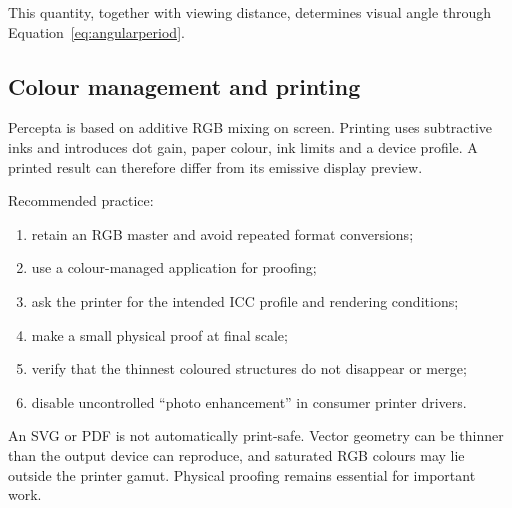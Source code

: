 This quantity, together with viewing distance, determines visual angle through Equation~\eqref{eq:angularperiod}.

\subsection{Colour management and printing}

Percepta is based on additive RGB mixing on screen. Printing uses subtractive inks and introduces dot gain, paper colour, ink limits and a device profile. A printed result can therefore differ from its emissive display preview.

Recommended practice:

\begin{enumerate}
  \item retain an RGB master and avoid repeated format conversions;
  \item use a colour-managed application for proofing;
  \item ask the printer for the intended ICC profile and rendering conditions;
  \item make a small physical proof at final scale;
  \item verify that the thinnest coloured structures do not disappear or merge;
  \item disable uncontrolled ``photo enhancement'' in consumer printer drivers.
\end{enumerate}

\begin{warningbox}
An SVG or PDF is not automatically print-safe. Vector geometry can be thinner than the output device can reproduce, and saturated RGB colours may lie outside the printer gamut. Physical proofing remains essential for important work.
\end{warningbox}

\clearpage

